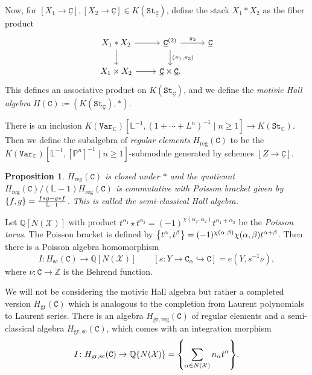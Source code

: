\documentclass{amsart}
\newtheorem{prop}[thm]{Proposition}
\theoremstyle{definition}
\theoremstyle{remark}
\theoremstyle{plain}
\theoremstyle{definition}
\theoremstyle{remark}
\newcommand{\C}{\mathbb{C}}
\newcommand{\Z}{\mathbb{Z}}
\newcommand{\Q}{\mathbb{Q}}
\renewcommand{\L}{\mathbb{L}}
\renewcommand{\P}{\mathbb{P}}
\newcommand{\mc}[1]{\mathcal{#1}}
\newcommand{\mr}[1]{\mathrm{#1}}
\newcommand{\mt}[1]{\mathtt{#1}}
\newcommand{\ul}[1]{\underline{#1}}
\newcommand{\1}{\mathbf{1}}
\newcommand{\2}{\mathbf{2}}
\newcommand{\3}{\mathbf{3}}
\begin{document}
Now, for $[X_1 \to \mt{\ul{C}}], [X_2 \to \mt{\ul{C}}] \in K(\mt{St}_{\mt{\ul{C}}})$, define the stack $X_1 * X_2$ as the fiber product
\begin{equation*}
\begin{tikzcd}
    X_1 * X_2 \ar{r} \ar{d} & \mt{\ul{C}}^{(2)} \ar{r}{\pi_2} \ar{d}{(\pi_1, \pi_3)} & \mt{\ul{C}} \\
    X_1 \times X_2 \ar{r} & \mt{\ul{C}} \times \mt{\ul{C}}.
\end{tikzcd}
\end{equation*}
This defines an associative product on $K(\mt{St}_{\mt{\ul{C}}})$, and we define the \textit{motivic Hall algebra} $H(\mt{C}) \coloneqq (K(\mt{St}_{\mt{\ul{C}}}), *)$.

There is an inclusion $K(\mt{Var}_{\C})[\L^{-1}, (1 + \cdots + L^n)^{-1} \mid n \geq 1] \to K(\mt{St}_{\C})$. Then we define the subalgebra of \textit{regular elements} $H_{\mr{reg}}(\mt{C})$ to be the $K(\mt{Var}_{\C})[\L^{-1}, [\P^n]^{-1} \mid n \geq 1]$-submodule generated by schemes $[Z \to \mt{\ul{C}}]$.

\begin{prop}
    $H_{\mr{reg}}(\mt{C})$ is closed under $*$ and the quotiennt $H_{\mr{reg}}(\mt{C}) / (\L - 1) H_{\mr{reg}}(\mt{C})$ is commutative with Poisson bracket given by $\qty{f, g} = \frac{f * g - g * f}{\L - 1}$. This is called the \textit{semi-classical Hall algebra}.
\end{prop}

Let $\Q[N(\mc{X})]$ with product $t^{\alpha_1} \star t^{\alpha_2} = (-1)^{\chi(\alpha_1, \alpha_2)} t^{\alpha_1 + \alpha_2}$ be the \textit{Poisson torus}. The Poisson bracket is defined by $\qty{t^{\alpha}, t^{\beta}} = (-1)^{\chi(\alpha, \beta)} \chi(\alpha, \beta) t^{\alpha + \beta}$. Then there is a Poisson algebra homomorphism
\[ I \colon H_{\mr{sc}}(\mt{C}) \to \Q[N(\mc{X})] \qquad [s \colon Y \to \mt{C}_{\alpha} \hookrightarrow \mt{C}] = e(Y, s^{-1} \nu), \]
where $\nu \colon \mt{C} \to \Z$ is the Behrend function.

We will not be considering the motivic Hall algebra but rather a completed version $H_{\mr{gr}}(\mt{C})$ which is analogous to the completion from Laurent polynomials to Laurent series. There is an algebra $H_{\mr{gr,reg}}(\mt{C})$ of regular elements and a semi-classical algebra $H_{\mr{gr,sc}}(\mt{C})$, which comes with an integration morphism 
\[ I \colon H_{\mr{gr,sc}}(\mt{C}) \to \Q \qty{N(\mc{X})} = \qty{\sum_{\alpha \in N(\mc{X})} n_{\alpha} t^{\alpha}}. \]
\end{document}
